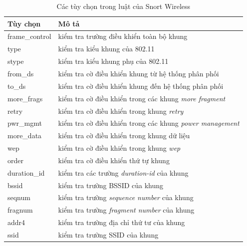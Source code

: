 \begin{table}[H]
\centering
\small
\setlength{\extrarowheight}{1pt}
\caption{\label{tab:snort-wireless-rule-options}Các tùy chọn trong luật của Snort Wireless}
\begin{tabular}{|p{4cm}|p{10.5cm}|}
\hline
\textbf{Tùy chọn} & \textbf{Mô tả}                                          \\ \hline
frame\_control    & kiểm tra trường điều khiển toàn bộ khung                \\ \hline
type              & kiểm tra kiểu khung của 802.11                          \\ \hline
stype             & kiểm tra kiểu khung phụ của 802.11                      \\ \hline
from\_ds          & kiểm tra cờ điều khiển khung từ hệ thống phân phối      \\ \hline
to\_ds            & kiểm tra cờ điều khiển khung đến hệ thống phân phối     \\ \hline
more\_frags       & kiểm tra cờ điều khiển trong các khung \emph{more fragment}    \\ \hline
retry             & kiểm tra cờ điều khiển trong khung \emph{retry}                \\ \hline
pwr\_mgmt         & kiểm tra cờ điều khiển trong các khung \emph{power management} \\ \hline
more\_data        & kiểm tra cờ điều khiển trong khung dữ liệu              \\ \hline
wep               & kiểm tra cờ điều khiển trong khung \emph{wep}                  \\ \hline
order             & kiểm tra cờ điều khiển thứ tự khung                      \\ \hline
duration\_id      & kiểm tra các trường \emph{duration-id} của khung                     \\ \hline
bssid             & kiểm tra trường BSSID của khung                                 \\ \hline
seqnum            & kiểm tra trường \emph{sequence number} của khung                \\ \hline
fragnum           & kiểm tra trường \emph{fragment number} của khung      \\ \hline
addr4             & kiểm tra trường địa chỉ thứ tư  của khung           \\ \hline
ssid              & kiểm tra trường SSID của khung                    \\ \hline
\end{tabular}
\end{table}

